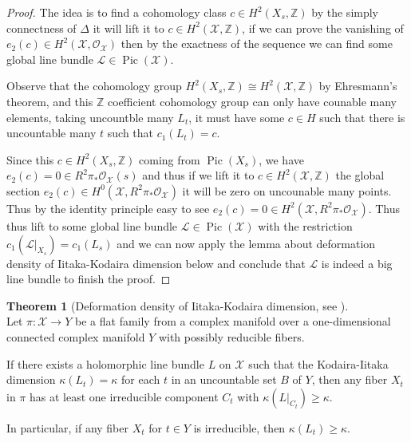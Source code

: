 \documentclass[11pt]{article}
\theoremstyle{definition}
\newtheorem{theorem}{Theorem}[section]
\begin{document}
\begin{proof}
	The idea is to find a cohomology class $c \in H^2(X_s,\mathbb{Z})$ by the simply connectness of $\Delta$ it will lift it to $c\in H^2(\mathcal{X},\mathbb{Z})$, if we can prove the vanishing of $e_2(c) \in H^2(\mathcal{X},\mathcal{O}_{\mathcal{X}})$ then by the exactness of the sequence we can find some global line bundle $\mathcal{L}\in \operatorname{Pic}(\mathcal{X})$.
	
	Observe that the cohomology group $H^2(X_s,\mathbb{Z})\cong H^2(\mathcal{X},\mathbb{Z})$  by Ehresmann's theorem, and this $\mathbb{Z}$ coefficient cohomology group can only have counable many elements, taking uncountble many $L_t$, it must have some $c\in H$ such that there is uncountable many $t$ such that $c_1(L_t) = c$.
	
	Since this $c\in H^2(X_s,\mathbb{Z})$ coming from $\operatorname{Pic}(X_s)$, we have $e_2(c) = 0\in R^2\pi_* \mathcal{O}_{\mathcal{X}}(s)$ and thus if we lift it to $c \in H^2(\mathcal{X},\mathbb{Z})$ the global section $e_2(c) \in H^0(\mathcal{X},R^2 \pi_* \mathcal{O}_{\mathcal{X}})$ it will be zero on uncounable many points. Thus by the identity principle easy to see $e_2(c) =0 \in H^2(\mathcal{X},R^2\pi_* \mathcal{O}_{\mathcal{X}})$. Thus thus lift to some global line bundle $\mathcal{L}\in \operatorname{Pic}(\mathcal{X})$ with the restriction $c_1(\mathcal{L}|_{X_s}) =c_1(L_s)$ and we can now apply the lemma about deformation density of Iitaka-Kodaira dimension below and conclude that $\mathcal{L}$ is indeed a big line bundle to finish the proof.
	
	\end{proof}
	
	\begin{theorem}[Deformation density of Iitaka-Kodaira dimension, see \cite{RaoTsai, LiebermanSernesi}]~\\
		Let $\pi: \mathcal{X} \rightarrow Y$ be a flat family from a complex manifold over a one-dimensional connected complex manifold $Y$ with possibly reducible fibers. 
		
		If there exists a holomorphic line bundle $L$ on $\mathcal{X}$ such that the Kodaira-Iitaka dimension $\kappa\left(L_t\right)=\kappa$ for each $t$ in an uncountable set $B$ of $Y$, then any fiber $X_t$ in $\pi$ has at least one irreducible component $C_t$ with $\kappa\left(\left.L\right|_{C_t}\right) \geq \kappa$. 
		
		In particular, if any fiber $X_t$ for $t \in Y$ is irreducible, then $\kappa\left(L_t\right) \geq \kappa$. 
	\end{theorem}
	\printbibliography	
	
\end{document}
